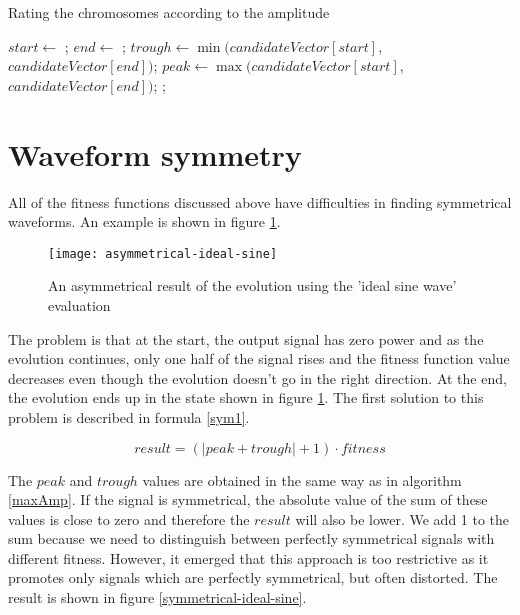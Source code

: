 \begin{algorithm}[H]
\caption{Rating the chromosomes according to the amplitude}
\label{maxAmp}
\begin{algorithmic}[1]
        \State $start \gets$ ;
        \State $end \gets$ ;
        \State $trough \gets \min(candidateVector[start]$, $candidateVector[end])$;
        \State $peak \gets \max(candidateVector[start]$, $candidateVector[end])$;
        \State \Return {};
    \EndFunction
\end{algorithmic}
\end{algorithm}

\section{Waveform symmetry}
All of the fitness functions discussed above have difficulties in finding symmetrical waveforms. An example is shown in figure \ref{asymmetrical-ideal-sine}.

\begin{figure}[!ht]
    \centerline{\texttt{[image: asymmetrical-ideal-sine]}\label{asymmetrical-ideal-sine}}
    \caption{An asymmetrical result of the evolution using the 'ideal sine wave' evaluation}
\end{figure}

The problem is that at the start, the output signal has zero power and as the evolution continues, only one half of the signal rises and the fitness function value decreases even though the evolution doesn't go in the right direction. At the end, the evolution ends up in the state shown in figure \ref{asymmetrical-ideal-sine}. The first solution to this problem is described in formula \ref{sym1}.

\begin{equation} \label{sym1}
result = (|peak + trough| + 1) \cdot fitness
\end{equation}

The $peak$ and $trough$ values are obtained in the same way as in algorithm \ref{maxAmp}. If the signal is symmetrical, the absolute value of the sum of these values is close to zero and therefore the $result$ will also be lower. We add 1 to the sum because we need to distinguish between perfectly symmetrical signals with different fitness. However, it emerged that this approach is too restrictive as it promotes only signals which are perfectly symmetrical, but often distorted. The result is shown in figure \ref{symmetrical-ideal-sine}.

